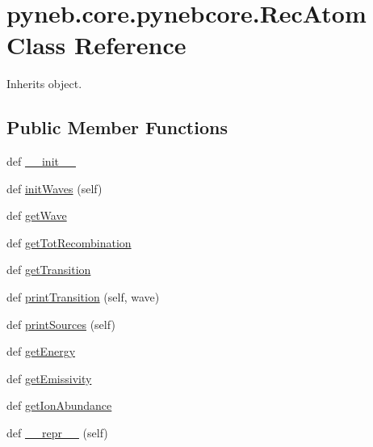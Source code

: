 \hypertarget{classpyneb_1_1core_1_1pynebcore_1_1_rec_atom}{}\section{pyneb.\+core.\+pynebcore.\+Rec\+Atom Class Reference}
\label{classpyneb_1_1core_1_1pynebcore_1_1_rec_atom}


Inherits object.

\subsection*{Public Member Functions}
\begin{DoxyCompactItemize}
\item 
def \hyperlink{classpyneb_1_1core_1_1pynebcore_1_1_rec_atom_abf13c53bf46bd7330bebd9397b4f8774}{\+\_\+\+\_\+init\+\_\+\+\_\+}
\item 
def \hyperlink{classpyneb_1_1core_1_1pynebcore_1_1_rec_atom_a20b990d9d745db7be03fdaac8390f919}{init\+Waves} (self)
\item 
def \hyperlink{classpyneb_1_1core_1_1pynebcore_1_1_rec_atom_a4c99566f33409cee77076ca8735568f0}{get\+Wave}
\item 
def \hyperlink{classpyneb_1_1core_1_1pynebcore_1_1_rec_atom_ab7e0b11cdc85dade76528fe5de9886c0}{get\+Tot\+Recombination}
\item 
def \hyperlink{classpyneb_1_1core_1_1pynebcore_1_1_rec_atom_abc77497db8e5d888d8424e4a82d50c2e}{get\+Transition}
\item 
def \hyperlink{classpyneb_1_1core_1_1pynebcore_1_1_rec_atom_acdf8a7cf94fee8be8335e4651c318a30}{print\+Transition} (self, wave)
\item 
def \hyperlink{classpyneb_1_1core_1_1pynebcore_1_1_rec_atom_a0f7e0f80b7e0057d59d61676ff5a54c0}{print\+Sources} (self)
\item 
def \hyperlink{classpyneb_1_1core_1_1pynebcore_1_1_rec_atom_a664340029b0a067b459cae45e13d50c5}{get\+Energy}
\item 
def \hyperlink{classpyneb_1_1core_1_1pynebcore_1_1_rec_atom_ac03957666aff1955387fcc03c6187ad3}{get\+Emissivity}
\item 
def \hyperlink{classpyneb_1_1core_1_1pynebcore_1_1_rec_atom_a250ec6b99eedd84bdb8eae97cbd4beef}{get\+Ion\+Abundance}
\item 
def \hyperlink{classpyneb_1_1core_1_1pynebcore_1_1_rec_atom_a7bed1e9b39a55269b74b2aeb455b819c}{\+\_\+\+\_\+repr\+\_\+\+\_\+} (self)
\end{DoxyCompactItemize}
